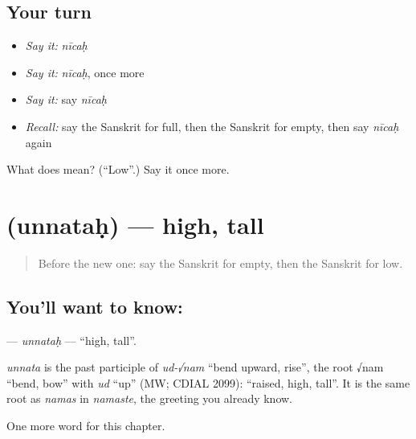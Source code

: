 \subsection*{Your turn}
\begin{itemize}
\raggedright
  \item \emph{Say it:} \emph{nīcaḥ}
  \item \emph{Say it:} \emph{nīcaḥ}, once more
  \item \emph{Say it:} say \emph{nīcaḥ}
  \item \emph{Recall:} say the Sanskrit for full, then the Sanskrit for empty, then say \emph{nīcaḥ} again
\end{itemize}

\begin{tcolorbox}[breakable,colback=teal!4,colframe=teal!35!black,title={Before you move on}]
What does  mean? (\textquotedblleft{}Low\textquotedblright{}.) Say it once more.
\end{tcolorbox}
\section[\texorpdfstring{\sk{उन्नतः} (unnataḥ)}{उन्नतः (unnataḥ)}]{ (unnataḥ) — high, tall}

\label{lesson:SA-C133-unnatah}



\begin{quote}
Before the new one: say the Sanskrit for empty, then the Sanskrit for low.
\end{quote}

\subsection*{You'll want to know: }
\textbf{} — \emph{unnataḥ} — \textquotedblleft{}high, tall\textquotedblright{}.

\begin{cousinweb}
\emph{unnata} is the past participle of \emph{ud-√nam} \textquotedblleft{}bend upward, rise\textquotedblright{}, the root √nam \textquotedblleft{}bend, bow\textquotedblright{} with \emph{ud} \textquotedblleft{}up\textquotedblright{} (MW; CDIAL 2099): \textquotedblleft{}raised, high, tall\textquotedblright{}. It is the same root as \emph{namas} in \emph{namaste}, the greeting you already know.
\end{cousinweb}

\begin{grammarlens}[title={What you've built}]
One more word for this chapter.
\end{grammarlens}

